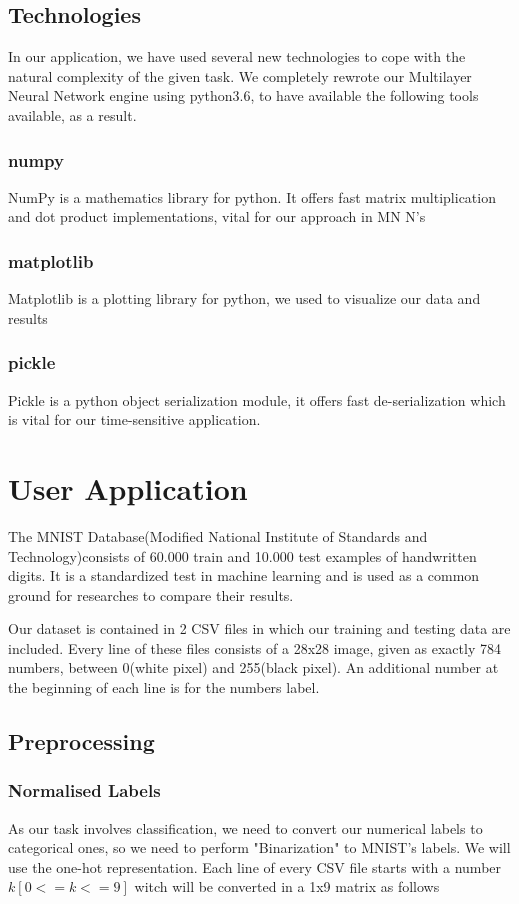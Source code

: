 \documentclass{proc}
\begin{document}
	\subsection{Technologies}
	In our application, we have used several new technologies to cope with the natural complexity of the given task. We completely rewrote our Multilayer Neural Network engine using python3.6, to have available the following tools available, as a result.
	\subsubsection{numpy}
	NumPy is a mathematics library for python. It offers fast matrix multiplication and dot product implementations, vital for our approach in MN N's
	\subsubsection{matplotlib}
	Matplotlib is a plotting library for python, we used to visualize our data and results
	\subsubsection{pickle}
	Pickle is a python object serialization module, it offers fast de-serialization which is vital for our time-sensitive application.	
	\section{User Application}
	The MNIST Database(Modified National Institute of Standards and Technology)consists of 60.000 train and 10.000 test examples of handwritten digits. It is a standardized test in machine learning and is used as a common ground for researches to compare their results.
	
	Our dataset is contained in 2 CSV files in which our training and testing data are included. Every line of these files consists of a 28x28 image, given as exactly 784 numbers, between 0(white pixel) and 255(black pixel). An additional number at the beginning of each line is for the numbers label.
	\subsection{Preprocessing}
	\subsubsection{Normalised Labels}
	As our task involves classification, we need to convert our numerical labels to categorical ones, so we need to perform "Binarization" to MNIST's labels. We will use the one-hot representation. Each line of every CSV file starts with a number ${k[0<=k<=9]}$ witch will be converted in a 1x9 matrix as follows
	
\end{document}
